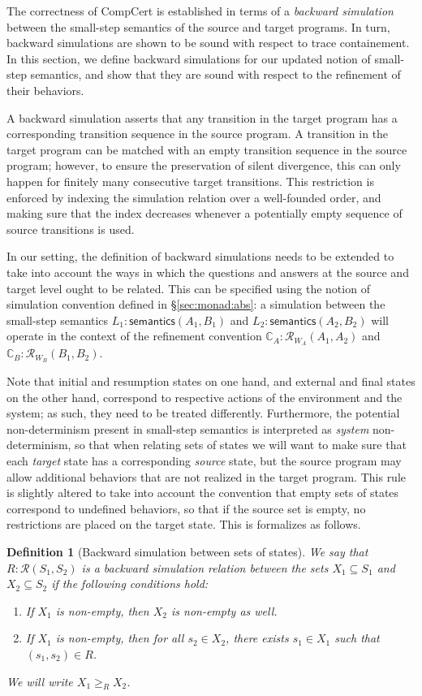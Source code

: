 \documentclass{article}
\newtheorem{definition}{Definition}
\newcommand{\kw}[1]{\ensuremath{ \mathsf{#1} }}
\begin{document}
The correctness of CompCert is established in terms of
a \emph{backward simulation}
between the small-step semantics of the source and target programs.
In turn, backward simulations
are shown to be sound with respect to trace containement.
In this section,
we define backward simulations for our updated notion
of small-step semantics,
and show that they are sound with respect to
the refinement of their behaviors.

A backward simulation asserts that any transition in the target program
has a corresponding transition sequence in the source program.
A transition in the target program can be matched with
an empty transition sequence in the source program;
however, to ensure the preservation of silent divergence,
this can only happen for finitely many consecutive target transitions.
This restriction is enforced by indexing the simulation relation
over a well-founded order,
and making sure that the index decreases
whenever a potentially empty sequence of source transitions is used.

In our setting,
the definition of backward simulations needs to be extended
to take into account the ways in which the questions and answers
at the source and target level ought to be related.
This can be specified using the notion of simulation convention
defined in \S\ref{sec:monad:abs}:
a simulation between the small-step semantics
$L_1 : \kw{semantics}(A_1, B_1)$ and
$L_2 : \kw{semantics}(A_2, B_2)$ will
operate in the context of the refinement convention
$\mathbb{C}_A : \mathcal{R}_{W_A}(A_1, A_2)$ and
$\mathbb{C}_B : \mathcal{R}_{W_B}(B_1, B_2)$.

Note that initial and resumption states on one hand,
and external and final states on the other hand,
correspond to respective actions of the environment and the system;
as such, they need to be treated differently.
Furthermore,
the potential non-determinism present in small-step semantics
is interpreted as \emph{system} non-determinism,
so that when relating sets of states
we will want to make sure that
each \emph{target} state has a corresponding \emph{source} state,
but the source program may allow additional behaviors
that are not realized in the target program.
This rule is slightly altered to take into account the convention that
empty sets of states correspond to undefined behaviors,
so that if the source set is empty,
no restrictions are placed on the target state.
This is formalizes as follows.

\begin{definition}[Backward simulation between sets of states]
We say that $R : \mathcal{R}(S_1, S_2)$ is a
\emph{backward simulation relation
  between the sets $X_1 \subseteq S_1$ and  $X_2 \subseteq S_2$}
if the following conditions hold:
\begin{enumerate}
\item
  If $X_1$ is non-empty,
  then $X_2$ is non-empty as well.
\item
  If $X_1$ is non-empty,
  then for all $s_2 \in X_2$,
  there exists $s_1 \in X_1$
  such that $(s_1, s_2) \in R$.
\end{enumerate}
We will write $X_1 \ge_R X_2$.
\end{definition}
\end{document}
